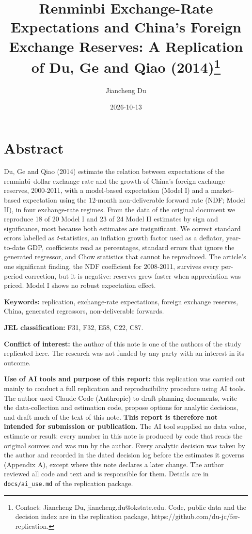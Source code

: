 \documentclass[
  12pt,
  a4paper,
]{article}
\title{Renminbi Exchange-Rate Expectations and China's Foreign Exchange
Reserves: A Replication of Du, Ge and Qiao (2014)\thanks{Contact:
Jiancheng Du, jiancheng.du@okstate.edu. Code, public data and the
decision index are in the replication package,
https://github.com/du-jc/fer-replication.}}
\author{Jiancheng Du}
\date{2026-10-13}
\begin{document}
\maketitle


\section*{Abstract}\label{abstract}

Du, Ge and Qiao (2014) estimate the relation between expectations of the
renminbi--dollar exchange rate and the growth of China's foreign
exchange reserves, 2000-2011, with a model-based expectation (Model I)
and a market-based expectation using the 12-month non-deliverable
forward rate (NDF; Model II), in four exchange-rate regimes. From the
data of the original document we reproduce 18 of 20 Model I and 23 of 24
Model II estimates by sign and significance, most because both estimates
are insignificant. We correct standard errors labelled as
\emph{t}-statistics, an inflation growth factor used as a deflator,
year-to-date GDP, coefficients read as percentages, standard errors that
ignore the generated regressor, and Chow statistics that cannot be
reproduced. The article's one significant finding, the NDF coefficient
for 2008-2011, survives every per-period correction, but it is negative:
reserves grew faster when appreciation was priced. Model I shows no
robust expectation effect.

\textbf{Keywords:} replication, exchange-rate expectations, foreign
exchange reserves, China, generated regressors, non-deliverable
forwards.

\textbf{JEL classification:} F31, F32, E58, C22, C87.

\textbf{Conflict of interest:} the author of this note is one of the
authors of the study replicated here. The research was not funded by any
party with an interest in its outcome.

\textbf{Use of AI tools and purpose of this report:} this replication
was carried out mainly to conduct a full replication and reproducibility
procedure using AI tools. The author used Claude Code (Anthropic) to
draft planning documents, write the data-collection and estimation code,
propose options for analytic decisions, and draft much of the text of
this note. \textbf{This report is therefore not intended for submission
or publication.} The AI tool supplied no data value, estimate or result:
every number in this note is produced by code that reads the original
sources and was run by the author. Every analytic decision was taken by
the author and recorded in the dated decision log before the estimates
it governs (Appendix A), except where this note declares a later change.
The author reviewed all code and text and is responsible for them.
Details are in \texttt{docs/ai\_use.md} of the replication package.
\end{document}

